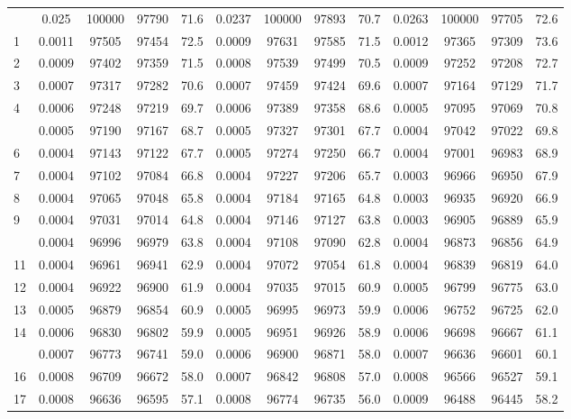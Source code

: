 \documentclass[
  14pt,
]{article}
\begin{document}
\begin{longtable}[t]{lcccccccccccc}
\endfoot
\bottomrule
\endlastfoot
0 & 0.025 & 100000 & 97790 & 71.6 & 0.0237 & 100000 & 97893 & 70.7 & 0.0263 & 100000 & 97705 & 72.6\\
1 & 0.0011 & 97505 & 97454 & 72.5 & 0.0009 & 97631 & 97585 & 71.5 & 0.0012 & 97365 & 97309 & 73.6\\
2 & 0.0009 & 97402 & 97359 & 71.5 & 0.0008 & 97539 & 97499 & 70.5 & 0.0009 & 97252 & 97208 & 72.7\\
3 & 0.0007 & 97317 & 97282 & 70.6 & 0.0007 & 97459 & 97424 & 69.6 & 0.0007 & 97164 & 97129 & 71.7\\
4 & 0.0006 & 97248 & 97219 & 69.7 & 0.0006 & 97389 & 97358 & 68.6 & 0.0005 & 97095 & 97069 & 70.8\\
\addlinespace
5 & 0.0005 & 97190 & 97167 & 68.7 & 0.0005 & 97327 & 97301 & 67.7 & 0.0004 & 97042 & 97022 & 69.8\\
6 & 0.0004 & 97143 & 97122 & 67.7 & 0.0005 & 97274 & 97250 & 66.7 & 0.0004 & 97001 & 96983 & 68.9\\
7 & 0.0004 & 97102 & 97084 & 66.8 & 0.0004 & 97227 & 97206 & 65.7 & 0.0003 & 96966 & 96950 & 67.9\\
8 & 0.0004 & 97065 & 97048 & 65.8 & 0.0004 & 97184 & 97165 & 64.8 & 0.0003 & 96935 & 96920 & 66.9\\
9 & 0.0004 & 97031 & 97014 & 64.8 & 0.0004 & 97146 & 97127 & 63.8 & 0.0003 & 96905 & 96889 & 65.9\\
\addlinespace
10 & 0.0004 & 96996 & 96979 & 63.8 & 0.0004 & 97108 & 97090 & 62.8 & 0.0004 & 96873 & 96856 & 64.9\\
11 & 0.0004 & 96961 & 96941 & 62.9 & 0.0004 & 97072 & 97054 & 61.8 & 0.0004 & 96839 & 96819 & 64.0\\
12 & 0.0004 & 96922 & 96900 & 61.9 & 0.0004 & 97035 & 97015 & 60.9 & 0.0005 & 96799 & 96775 & 63.0\\
13 & 0.0005 & 96879 & 96854 & 60.9 & 0.0005 & 96995 & 96973 & 59.9 & 0.0006 & 96752 & 96725 & 62.0\\
14 & 0.0006 & 96830 & 96802 & 59.9 & 0.0005 & 96951 & 96926 & 58.9 & 0.0006 & 96698 & 96667 & 61.1\\
\addlinespace
15 & 0.0007 & 96773 & 96741 & 59.0 & 0.0006 & 96900 & 96871 & 58.0 & 0.0007 & 96636 & 96601 & 60.1\\
16 & 0.0008 & 96709 & 96672 & 58.0 & 0.0007 & 96842 & 96808 & 57.0 & 0.0008 & 96566 & 96527 & 59.1\\
17 & 0.0008 & 96636 & 96595 & 57.1 & 0.0008 & 96774 & 96735 & 56.0 & 0.0009 & 96488 & 96445 & 58.2\\

\end{longtable}
\end{document}
